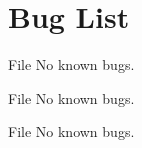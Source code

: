 \chapter{Bug List}
\hypertarget{bug}{}\label{bug}

\begin{DoxyRefList}
\item[File \doxylink{packet__header_8h}{packet\+\_\+header.h} ]\label{bug__bug000001}%
%
No known bugs.  
\item[File \doxylink{receiver_8c}{receiver.c} ]\label{bug__bug000002}%
%
No known bugs.  
\item[File \doxylink{sender_8c}{sender.c} ]\label{bug__bug000003}%
%
No known bugs. 
\end{DoxyRefList}